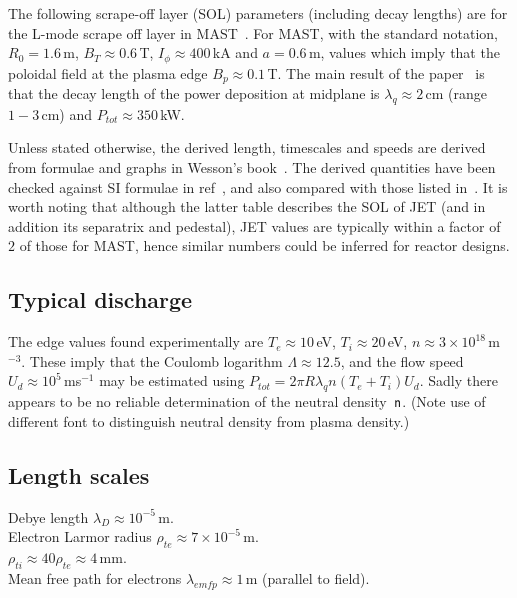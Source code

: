 The following scrape-off layer (SOL) parameters (including decay lengths) are for the
L-mode scrape off layer in MAST~\cite{Mi13Expe}.
For MAST,  with the standard notation,
$R_0=1.6$\,m, $B_T \approx 0.6$\,T, $I_\phi \approx 400$\,kA and
$a=0.6$\,m, values which imply that the poloidal field at the
plasma edge $B_p \approx 0.1$\,T.
The main result of the paper~\cite{Mi13Expe} is that the decay length of the power
deposition at midplane is $\lambda_q \approx 2$\,cm (range $1-3$\,cm)
and $P_{tot} \approx 350$\,kW.

Unless stated otherwise, the derived length, timescales and speeds are derived from
formulae and graphs in Wesson's book~\cite[Chap 10]{wesson}.
The derived quantities have been checked against SI formulae
in ref~\cite[Table 2.2]{miyamoto}, and also compared with those
listed in~\cite[Appendix]{Xu10Inte}. It is worth noting that although
the latter table describes the SOL of JET (and in addition its separatrix and pedestal),
JET values are typically within a factor of~$2$ of those for MAST, hence similar
numbers could be inferred for reactor designs.

\subsection{Typical discharge}

The edge values found experimentally are 
$T_e \approx 10$\,eV, $T_i \approx 20$\,eV, $n \approx 3 \times 10^{18}$\,m$^{-3}$.
These imply that the Coulomb logarithm $\Lambda \approx 12.5$, and
the flow speed~$U_d \approx 10^5$\,ms$^{-1}$ may be estimated using
$P_{tot}= 2 \pi R \lambda_q n (T_e+T_i) U_d$.
Sadly there appears to be no reliable determination of the neutral density~${\sf n}$.
(Note use of different font to distinguish neutral density from plasma density.)

\subsection{Length scales}

Debye length $\lambda_D \approx 10^{-5}$\,m. \\
Electron Larmor radius $\rho_{te} \approx 7 \times 10^{-5}$\,m. \\
$\rho_{ti} \approx 40 \rho_{te} \approx 4$\,mm. \\
Mean free path for electrons $\lambda_{emfp} \approx 1$\,m (parallel to field).

